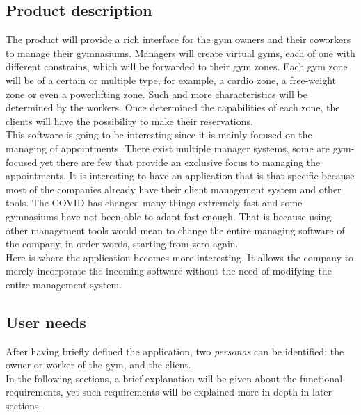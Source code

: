 \documentclass[a4paper,12pt]{book}
\begin{document}
\subsection{Product description}
The product will provide a rich interface for the gym owners and their coworkers to manage their gymnasiums. Managers will create virtual gyms, each of one with different constrains, which will be forwarded to their gym zones. Each gym zone will be of a certain or multiple type, for example, a cardio zone, a free-weight zone or even a powerlifting zone. Such and more characteristics will be determined by the workers. Once determined the capabilities of each zone, the clients will have the possibility to make their reservations.
\\[8pt]
This software is going to be interesting since it is mainly focused on the managing of appointments. There exist multiple manager systems, some are gym-focused yet there are few that provide an exclusive focus to managing the appointments. It is interesting to have an application that is that specific because most of the companies already have their client management system and other tools. The COVID has changed many things extremely fast and some gymnasiums have not been able to adapt fast enough. That is because using other management tools would mean to change the entire managing software of the company, in order words, starting from zero again.
\\[8pt]
Here is where the application becomes more interesting. It allows the company to merely incorporate the incoming software without the need of modifying the entire management system.
\subsection{User needs}
After having briefly defined the application, two \emph{personas} can be identified: the owner or worker of the gym, and the client.
\\[8pt]
In the following sections, a brief explanation will be given about the functional requirements, yet such requirements will be explained more in depth in later sections.
\end{document}
